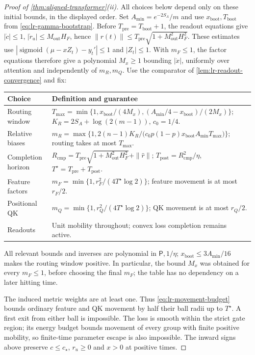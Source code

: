 \begin{proof}[Proof of \cref{thm:aligned-transformer}(ii)]
All choices below depend only on these initial bounds, in the displayed
order. Set $A_{\min}=e^{-2S_A}/m$ and use
$x_{\mathrm{boot}},T_{\mathrm{boot}}$ from \eqref{eq:lr-gamma-bootstrap}.
Before $T_{\mathrm{pre}}=T_{\mathrm{boot}}+1$, the readout equations give
$|\dot c|\le1$, $|\dot r_u|\le M_{\mathrm{out}}H_F$, hence
$\|r(t)\|\le T_{\mathrm{pre}}\sqrt{1+M_{\mathrm{out}}^2H_F^2}$.
These estimates use $|\operatorname{sigmoid}(\mu-xZ_t)-y_t'|\le1$ and
$|Z_t|\le1$. With $m_F\le1$, the factor equations therefore give a
polynomial $M_x\ge1$ bounding $|\dot x|$, uniformly over attention and
independently of $m_R,m_Q$. Use the comparator of
\cref{lem:lr-readout-convergence} and fix:
\begin{center}
\small
\begin{tabular}{@{}p{.20\linewidth}p{.74\linewidth}@{}}
\toprule
Choice & Definition and guarantee \\
\midrule
Routing window & $T_{\max}=\min\{1,x_{\mathrm{boot}}/(4M_x),
(A_{\min}/4-x_{\mathrm{boot}})/(2M_x)\}$;
$K_R=2S_A+\log(2(m-1))$, $c_0=1/4$. \\
Relative biases & $m_R=\max\{1,2(n-1)K_R/\bigl(c_0p(1-p)x_{\mathrm{boot}}A_{\min}T_{\max}\bigr)\}$;
routing takes at most $T_{\max}$. \\
Completion horizon & $R_{\mathrm{cmp}}=T_{\mathrm{pre}}\sqrt{1+M_{\mathrm{out}}^2H_F^2}+\|\widehat r\|$;
$T_{\mathrm{post}}=R_{\mathrm{cmp}}^2/\eta$,
$T^\star=T_{\mathrm{pre}}+T_{\mathrm{post}}$. \\
Feature factors & $m_F=\min\{1,r_F^2/(4T^\star\log2)\}$;
feature movement is at most $r_F/2$. \\
Positional QK & $m_Q=\min\{1,r_Q^2/(4T^\star\log2)\}$;
QK movement is at most $r_Q/2$. \\
Readouts & Unit mobility throughout; convex loss completion remains active. \\
\bottomrule
\end{tabular}
\end{center}
All relevant bounds and inverses are polynomial in $\mathsf P,1/\eta$;
$x_{\mathrm{boot}}\le3A_{\min}/16$ makes the routing window positive.
In particular, the bound $M_x$ was obtained for every $m_F\le1$, before
choosing the final $m_F$; the table has no dependency on a later hitting time.

The induced metric weights are at least one. Thus
\eqref{eq:lr-movement-budget} bounds ordinary feature and QK movement
by half their ball radii up to $T^\star$. A first exit from either ball is
impossible. The loss is smooth within the strict gate region; its energy
budget bounds movement of every group with finite positive mobility, so
finite-time parameter escape is also impossible. The inward signs above
preserve $c\le c_\star$, $r_u\ge0$ and $x>0$ at positive times.


\end{proof}
